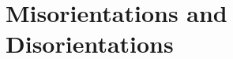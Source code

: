 % 
%



\renewcommand{\chabbr}{MISORI}



\chapter{Misorientations and Disorientations\label{\chabbr:ch:Misorientations}}

